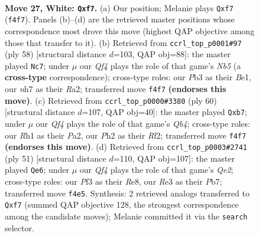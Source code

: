 \documentclass[11pt]{article}
\begin{document}
\clearpage

\begin{figure}[p]\centering
\begin{subfigure}{0.46\textwidth}\centering
\resizebox{\linewidth}{!}{%
\newchessgame
\chessboard[
  setfen={1k3b1r/1p2pp1n/1r1p2p1/1b6/3PPQ2/1P2RP2/6PP/1K5R w - - 0 27},
  showmover=false,
  pgfstyle=straightmove, color=movearrow, markmove={f4-f7}
]}
\caption{}
\end{subfigure}\hfill
\begin{subfigure}{0.46\textwidth}\centering
\resizebox{\linewidth}{!}{%
\newchessgame
\chessboard[
  setfen={q5r1/3nprbk/3p3p/1NpP1p2/P4P2/1P3Q2/R5P1/4BRK1 w - - 1 30},
  showmover=false,
  pgfstyle=straightmove, color=movearrow, markmove={b5-c7}
]}
\caption{}
\end{subfigure}
\\[4pt]
\begin{subfigure}{0.46\textwidth}\centering
\resizebox{\linewidth}{!}{%
\newchessgame
\chessboard[
  setfen={5rk1/1p3p1p/3p2p1/8/1Q3P1b/3r3b/PP3R1P/4R1K1 w - - 6 31},
  showmover=false,
  pgfstyle=straightmove, color=movearrow, markmove={b4-b7}
]}
\caption{}
\end{subfigure}\hfill
\begin{subfigure}{0.46\textwidth}\centering
\resizebox{\linewidth}{!}{%
\newchessgame
\chessboard[
  setfen={r3r1k1/pp2qp1p/2p3p1/4P3/2QP4/P7/1P4PP/3RR1K1 b - - 0 26},
  showmover=false,
  pgfstyle=straightmove, color=movearrow, markmove={e7-e6}
]}
\caption{}
\end{subfigure}
\caption{\textbf{Move 27, White: \texttt{Qxf7}.} (a) Our position; Melanie plays \texttt{Qxf7} (\texttt{f4f7}). Panels (b)--(d) are the retrieved master positions whose correspondence most drove this move (highest QAP objective among those that transfer to it). (b) Retrieved from \texttt{ccrl\_top\_p0001\#97} (ply 58) [structural distance $d$=103, QAP obj=88]: the master played \texttt{Nc7}; under $\mu$ our \emph{Qf4} plays the role of that game's \emph{Nb5} (a \textbf{cross-type} correspondence); cross-type roles: our \emph{P}b3 as their \emph{B}e1, our \emph{n}h7 as their \emph{R}a2; transferred move \texttt{f4f7} \textbf{(endorses this move)}. (c) Retrieved from \texttt{ccrl\_top\_p0000\#3380} (ply 60) [structural distance $d$=107, QAP obj=40]: the master played \texttt{Qxb7}; under $\mu$ our \emph{Qf4} plays the role of that game's \emph{Qb4}; cross-type roles: our \emph{R}h1 as their \emph{P}a2, our \emph{P}h2 as their \emph{R}f2; transferred move \texttt{f4f7} \textbf{(endorses this move)}. (d) Retrieved from \texttt{ccrl\_top\_p0003\#2741} (ply 51) [structural distance $d$=110, QAP obj=107]: the master played \texttt{Qe6}; under $\mu$ our \emph{Qf4} plays the role of that game's \emph{Qe2}; cross-type roles: our \emph{P}f3 as their \emph{R}e8, our \emph{R}e3 as their \emph{P}b7; transferred move \texttt{f4e5}. Synthesis: 2 retrieved analogs transferred to \texttt{Qxf7} (summed QAP objective 128, the strongest correspondence among the candidate moves); Melanie committed it via the \texttt{search} selector.}
\label{fig:thought-m52}
\end{figure}
\end{document}
